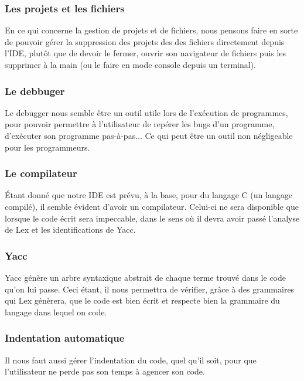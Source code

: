 \documentclass[a4paper,12pt]{article}
\begin{document}
	\subsubsection*{Les projets et les fichiers}
	
		En ce qui concerne la gestion de projets et de fichiers, nous pensons faire en sorte de pouvoir gérer la suppression des projets des des fichiers directement depuis l'IDE, plutôt que de devoir le fermer, ouvrir son navigateur de fichiers puis les supprimer à la main (ou le faire en mode console depuis un terminal).
		
	\subsubsection*{Le debbuger}
	
		Le debugger nous semble être un outil utile lors de l'exécution de programmes, pour pouvoir permettre à l'utilisateur de repérer les bugs d'un programme, d'exécuter son programme pas-à-pas... Ce qui peut être un outil non négligeable pour les programmeurs.
		
	\subsubsection*{Le compilateur}
	
		Étant donné que notre IDE est prévu, à la base, pour du langage C (un langage compilé), il semble évident d'avoir un compilateur. Celui-ci ne sera disponible que lorsque le code écrit sera impeccable, dans le sens où il devra avoir passé l'analyse de Lex et les identifications de Yacc.
		
	\subsubsection*{Yacc}
	
		Yacc génère un arbre syntaxique abstrait de chaque terme trouvé dans le code qu'on lui passe. Ceci étant, il nous permettra de vérifier, grâce à des grammaires qui Lex génèrera, que le code est bien écrit et respecte bien la grammaire du langage dans lequel on code.
		
	\subsubsection*{Indentation automatique}
	
		Il nous faut aussi gérer l'indentation du code, quel qu'il soit, pour que l'utilisateur ne perde pas son temps à agencer son code.
\end{document}
